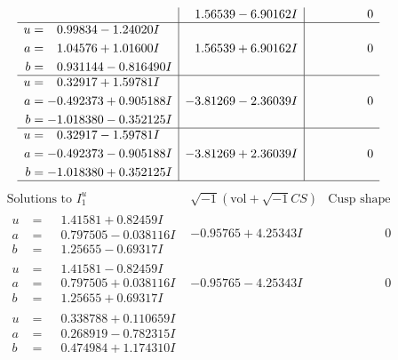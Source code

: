 \documentclass[1p]{elsarticle_modified}
\theoremstyle{definition}
\newcommand{\I}{\sqrt{-1}}
\begin{document}
$$\begin{array}{c|c|c}
 & \phantom{-}1.56539 - 6.90162 I & \phantom{-0.000000 } 0 \\ \hline\begin{aligned}
u &= \phantom{-}0.99834 - 1.24020 I \\
a &= \phantom{-}1.04576 + 1.01600 I \\
b &= \phantom{-}0.931144 - 0.816490 I\end{aligned}
 & \phantom{-}1.56539 + 6.90162 I & \phantom{-0.000000 } 0 \\ \hline\begin{aligned}
u &= \phantom{-}0.32917 + 1.59781 I \\
a &= -0.492373 + 0.905188 I \\
b &= -1.018380 - 0.352125 I\end{aligned}
 & -3.81269 - 2.36039 I & \phantom{-0.000000 } 0 \\ \hline\begin{aligned}
u &= \phantom{-}0.32917 - 1.59781 I \\
a &= -0.492373 - 0.905188 I \\
b &= -1.018380 + 0.352125 I\end{aligned}
 & -3.81269 + 2.36039 I & \phantom{-0.000000 } 0\\
 \hline 
 \end{array}$$\newpage$$\begin{array}{c|c|c}  
\text{Solutions to }I^u_{1}& \I (\text{vol} + \sqrt{-1}CS) & \text{Cusp shape}\\
 \hline 
\begin{aligned}
u &= \phantom{-}1.41581 + 0.82459 I \\
a &= \phantom{-}0.797505 - 0.038116 I \\
b &= \phantom{-}1.25655 - 0.69317 I\end{aligned}
 & -0.95765 + 4.25343 I & \phantom{-0.000000 } 0 \\ \hline\begin{aligned}
u &= \phantom{-}1.41581 - 0.82459 I \\
a &= \phantom{-}0.797505 + 0.038116 I \\
b &= \phantom{-}1.25655 + 0.69317 I\end{aligned}
 & -0.95765 - 4.25343 I & \phantom{-0.000000 } 0 \\ \hline\begin{aligned}
u &= \phantom{-}0.338788 + 0.110659 I \\
a &= \phantom{-}0.268919 - 0.782315 I \\
b &= \phantom{-}0.474984 + 1.174310 I\end{aligned}

\end{array}$$
\end{document}
